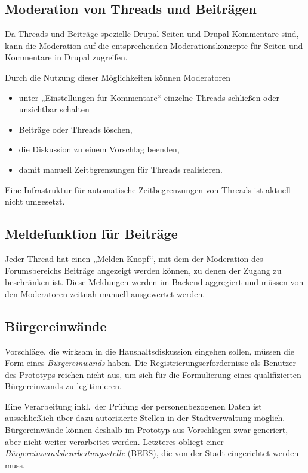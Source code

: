 \documentclass[11pt,a4paper,twoside]{article}
\begin{document}
\subsection*{Moderation von Threads und Beiträgen} 

Da Threads und Beiträge spezielle Drupal-Seiten und Drupal-Kommentare sind,
kann die Moderation auf die entsprechenden Moderationskonzepte für Seiten und
Kommentare in Drupal zugreifen. 

Durch die Nutzung dieser Möglichkeiten können Moderatoren
\begin{itemize}\itemsep0pt
\item unter „Einstellungen für Kommentare“ einzelne Threads schließen oder
  unsichtbar schalten 
\item Beiträge oder Threads löschen,
\item die Diskussion zu einem Vorschlag beenden,
\item damit manuell Zeitbgrenzungen für Threads realisieren. 
\end{itemize}

Eine Infrastruktur für automatische Zeitbegrenzungen von Threads ist aktuell
nicht umgesetzt.

\subsection*{Meldefunktion für Beiträge} 

Jeder Thread hat einen „Melden-Knopf“, mit dem der Moderation des
Forumsbereichs Beiträge angezeigt werden können, zu denen der Zugang zu
beschränken ist.  Diese Meldungen werden im Backend aggregiert und müssen von
den Moderatoren zeitnah manuell ausgewertet werden.

\subsection{Bürgereinwände} 

Vorschläge, die wirksam in die Haushaltsdiskussion eingehen sollen, müssen die
Form eines \emph{Bürgereinwands} haben. Die Registrierungserfordernisse als
Benutzer des Prototyps reichen nicht aus, um sich für die Formulierung eines
qualifizierten Bürgereinwands zu legitimieren.  

Eine Verarbeitung inkl.\ der Prüfung der personenbezogenen Daten ist
ausschließlich über dazu autorisierte Stellen in der Stadtverwaltung
möglich. Bürgereinwände können deshalb im Prototyp aus Vorschlägen zwar
generiert, aber nicht weiter verarbeitet werden. Letzteres obliegt einer
\emph{Bürgereinwandsbearbeitungsstelle} (BEBS), die von der Stadt eingerichtet
werden muss.
\end{document}
